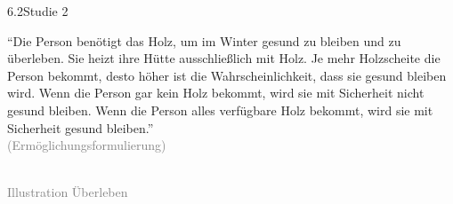 \documentclass[xcolor=table,9pt,aspectratio=169]{beamer}
\begin{document}
\begin{frame}{\vspace*{10mm}6.2\hspace*{1em}Studie 2}
\begin{multicols}{2}
   \enquote{Die Person benötigt das Holz, um im Winter gesund zu bleiben und zu überleben. Sie heizt ihre Hütte ausschließlich mit Holz. Je mehr Holzscheite die Person bekommt, desto höher ist die Wahrscheinlichkeit, dass sie gesund bleiben wird. Wenn die Person gar kein Holz bekommt, wird sie mit Sicherheit nicht gesund bleiben. Wenn die Person alles verfügbare Holz bekommt, wird sie mit Sicherheit gesund bleiben.}\\
   \medskip
   \textcolor{gray}{(Ermöglichungsformulierung)}
   \vfill
   \begin{center}
      \\
      \footnotesize{\textcolor{gray}{Illustration Überleben}}
   \end{center}
\end{multicols}
\end{frame}
\end{document}
